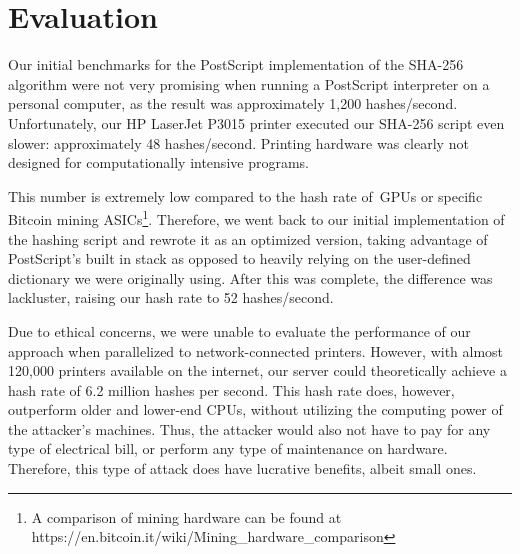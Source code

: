 \section{Evaluation}

Our initial benchmarks for the PostScript implementation of the SHA-256 algorithm were not very promising when running a PostScript interpreter on a personal computer, as the result was approximately 1,200 hashes/second.
Unfortunately, our HP LaserJet P3015 printer executed our SHA-256 script even slower: approximately 48 hashes/second.
Printing hardware was clearly not designed for computationally intensive programs.

This number is extremely low compared to the hash rate of GPUs or specific Bitcoin mining ASICs\footnote{A comparison of mining hardware can be found at https://en.bitcoin.it/wiki/Mining\_hardware\_comparison}.
Therefore, we went back to our initial implementation of the hashing script and rewrote it as an optimized version, taking advantage of PostScript’s built in stack as opposed to heavily relying on the user-defined dictionary we were originally using.
After this was complete, the difference was lackluster, raising our hash rate to 52 hashes/second.

Due to ethical concerns, we were unable to evaluate the performance of our approach when parallelized to network-connected printers.
However, with almost 120,000 printers available on the internet, our server could theoretically achieve a hash rate of 6.2 million hashes per second.
This hash rate does, however, outperform older and lower-end CPUs, without utilizing the computing power of the attacker's machines.
Thus, the attacker would also not have to pay for any type of electrical bill, or perform any type of maintenance on hardware.
Therefore, this type of attack does have lucrative benefits, albeit small ones.
